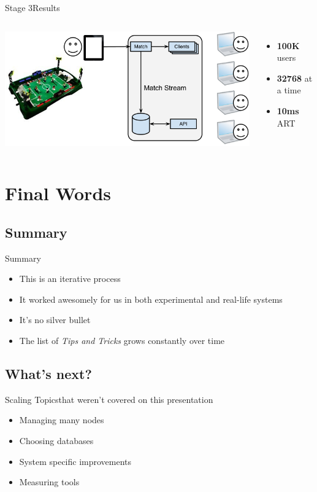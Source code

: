 \documentclass[utf8]{beamer}
\begin{document}
\begin{frame}{Stage 3}{Results}
	\begin{columns}
			\includegraphics[top=-1,width=\textwidth]{img/results-4.png}
			\begin{itemize}
				\item \textbf{\Large 100K} users
				\item \textbf{\Large 32768} at a time
				\item \textbf{\Large 10ms} ART
			\end{itemize}
	\end{columns}
\end{frame}

\section{Final Words}
\subsection{Summary}
\begin{frame}{Summary}
	\begin{itemize}
		\item<+-> This is an \alert{iterative} process
		\item<+-> It worked awesomely for us in both experimental and real-life systems
		\item<+-> It's no \alert{silver bullet}
		\item<+-> The list of \emph{Tips and Tricks} grows \alert{constantly} over time
	\end{itemize}
\end{frame}
\subsection{What's next?}
\begin{frame}{Scaling Topics}{that weren't covered on this presentation}
	\begin{itemize}
		\item Managing many nodes
		\item Choosing databases
		\item System specific improvements
		\item Measuring tools
	\end{itemize}
\end{frame}
\end{document}
